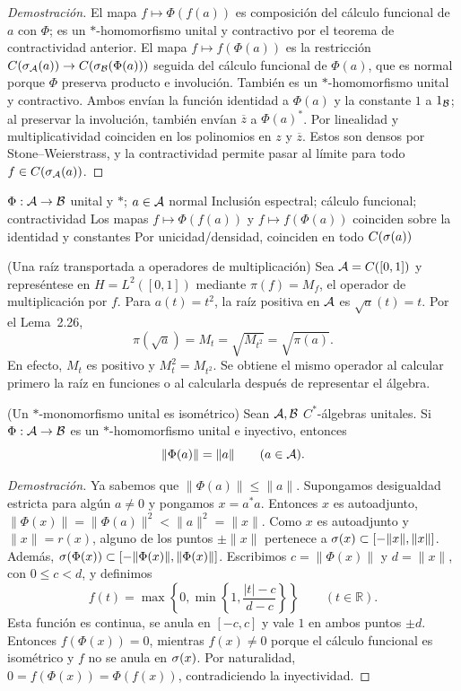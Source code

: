 \begin{proof}[Demostración]
El mapa $f\mapsto\Phi(f(a))$ es composición del cálculo funcional de $a$
con $\Phi$; es un $*$-homomorfismo unital y contractivo por el teorema de
contractividad anterior.
El mapa $f\mapsto f(\Phi(a))$ es la restricción
$C(\sigma_\mathcal A(a))\to C(\sigma_\mathcal B(\Phi(a)))$ seguida del cálculo funcional de
$\Phi(a)$, que es normal porque $\Phi$ preserva producto e involución.
También es un $*$-homomorfismo unital y contractivo. Ambos envían la función
identidad a $\Phi(a)$ y la constante $1$ a $1_\mathcal B$; al preservar la involución,
también envían $\overline z$ a $\Phi(a)^*$. Por linealidad y multiplicatividad
coinciden en los polinomios en $z$ y $\overline z$. Estos son densos por
Stone--Weierstrass, y la contractividad permite pasar al límite para todo
$f\in C(\sigma_\mathcal A(a))$.
\end{proof}

\proofdiagram
{$\Phi:\mathcal A\to\mathcal B$ unital y $*$; $a\in\mathcal A$ normal}
{Inclusión espectral; cálculo funcional; contractividad}
{Los mapas $f\mapsto\Phi(f(a))$ y $f\mapsto f(\Phi(a))$ coinciden sobre la identidad y constantes}
{Por unicidad/densidad, coinciden en todo $C(\sigma(a))$}

\begin{cthejemplo}{(Una raíz transportada a operadores de multiplicación)}
Sea $\mathcal A=C([0,1])$ y represéntese en $H=L^2([0,1])$ mediante
$\pi(f)=M_f$, el operador de multiplicación por $f$.
Para $a(t)=t^2$, la raíz positiva en $\mathcal A$ es
$\sqrt a(t)=t$. Por el Lema~2.26,
\[
 \pi(\sqrt a)=M_t=\sqrt{M_{t^2}}=\sqrt{\pi(a)}.
\]
En efecto, $M_t$ es positivo y $M_t^2=M_{t^2}$.
Se obtiene el mismo operador al calcular primero la raíz en funciones
o al calcularla después de representar el álgebra.
\end{cthejemplo}

\begin{cthteorema}{(Un $*$-monomorfismo unital es isométrico)}
Sean $\mathcal A,\mathcal B$ $C^*$-álgebras unitales. Si $\Phi:\mathcal A\to\mathcal B$ es un $*$-homomorfismo unital
e inyectivo, entonces
\[
 \|\Phi(a)\|=\|a\|\qquad(a\in\mathcal A).
\]
\end{cthteorema}

\begin{proof}[Demostración]
Ya sabemos que $\|\Phi(a)\|\le\|a\|$. Supongamos desigualdad estricta para algún $a\neq0$ y
pongamos $x=a^*a$. Entonces $x$ es autoadjunto,
$\|\Phi(x)\|=\|\Phi(a)\|^2<\|a\|^2=\|x\|$.
Como $x$ es autoadjunto y $\|x\|=r(x)$, alguno de los puntos $\pm\|x\|$ pertenece a
$\sigma(x)\subset[-\|x\|,\|x\|]$.
Además, $\sigma(\Phi(x))\subset[-\|\Phi(x)\|,\|\Phi(x)\|]$.
Escribimos $c=\|\Phi(x)\|$ y $d=\|x\|$, con $0\le c<d$, y definimos
\[
 f(t)=\max\!\left\{0,\min\!\left\{1,\frac{|t|-c}{d-c}\right\}\right\}
 \qquad(t\in\mathbb R).
\]
Esta función es continua, se anula en $[-c,c]$ y vale $1$ en ambos puntos
$\pm d$. Entonces
$f(\Phi(x))=0$, mientras $f(x)\neq0$ porque el cálculo funcional es isométrico
y $f$ no se anula en $\sigma(x)$. Por naturalidad,
$0=f(\Phi(x))=\Phi(f(x))$, contradiciendo la inyectividad.
\end{proof}

